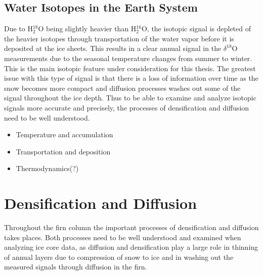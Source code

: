 \documentclass[../../CompleteThesis2/Complete_2ndDraft]{subfiles}
\begin{document}
\subsection[Relation to Temperature]{Water Isotopes in the Earth System}
\label{Subsec:Ice_WaterIsotopes_EarthSystem}
Due to H$_2^{18}$O being slightly heavier than H$_2^{16}$O, the isotopic signal is depleted of the heavier isotopes through transportation of the water vapor before it is deposited at the ice sheets. This results in a clear annual signal in the $\delta^{18}$O measurements due to the seasonal temperature changes from summer to winter. This is the main isotopic feature under consideration for this thesis. The greatest issue with this type of signal is that there is a loss of information over time as the snow becomes more compact and diffusion processes washes out some of the signal throughout the ice depth. Thus to be able to examine and analyze isotopic signals more accurate and precisely, the processes of densification and diffusion need to be well understood.

\begin{itemize}
	\item Temperature and accumulation
	\item Transportation and deposition
	\item Thermodynamics(?)
\end{itemize}


\section[Densification and Diffusion][Densification and Diffusion]{Densification and Diffusion}
\label{Sec:Ice_DensificationAndDiffusion}
Throughout the firn column the important processes of densification and diffusion takes places. Both processes need to be well understood and examined when analyzing ice core data, as diffusion and densification play a large role in thinning of annual layers due to compression of snow to ice and in washing out the measured signals through diffusion in the firn.
\end{document}
